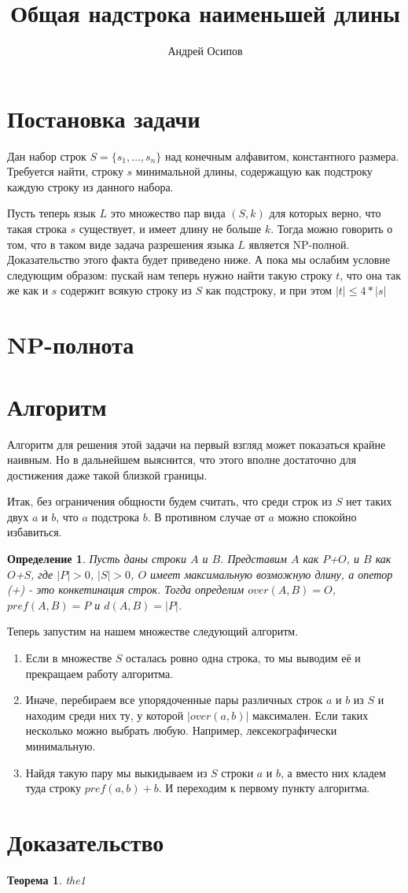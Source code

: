 \documentclass[a4paper,12pt]{article}
\title{Общая надстрока наименьшей длины}
\author{Андрей Осипов}
\newtheorem{theorem}{Теорема}
\newtheorem{definition}{Определение}
\begin{document}
\Russian
\maketitle

\section{Постановка задачи}
Дан набор строк $S = \{s_1,\dots,s_n\}$ над конечным алфавитом, константного размера. 
Требуется найти, строку $s$ минимальной длины, содержащую как подстроку каждую строку из данного набора.

Пусть теперь язык $L$ это множество пар вида $(S, k)$ для которых верно, что такая строка $s$ существует, и имеет длину не больше $k$.
Тогда можно говорить о том, что в таком виде задача разрешения языка $L$ является NP-полной.
Доказательство этого факта будет приведено ниже.
А пока мы ослабим условие следующим образом: пускай нам теперь нужно найти такую строку $t$, 
что она так же как и $s$ содержит всякую строку из $S$ как подстроку, и при этом $|t| \leq 4*|s|$

\section{NP-полнота}

\section{Алгоритм}
Алгоритм для решения этой задачи на первый взгляд может показаться крайне наивным.
Но в дальнейшем выяснится, что этого вполне достаточно для достижения даже такой близкой границы.

Итак, без ограничения общности будем считать, что среди строк из $S$ нет таких двух $a$ и $b$, что $a$ подстрока $b$.
В противном случае от $a$ можно спокойно избавиться.

\begin{definition}
Пусть даны строки $A$ и $B$.
Представим $A$ как $P$+$O$, и $B$ как $O$+$S$, где $|P|>0$, $|S|>0$, $O$ имеет максимальную возможную длину, а опетор (+) - это конкетинация строк.
Тогда определим $over(A, B) = O$, $pref(A, B) = P$ и $d(A, B) = |P|$.
\end{definition}

Теперь запустим на нашем множестве следующий алгоритм.
\begin{enumerate}
\item Если в множестве $S$ осталась ровно одна строка, то мы выводим её и прекращаем работу алгоритма.
\item Иначе, перебираем все упорядоченные пары различных строк $a$ и $b$ из $S$ и находим среди них ту, у которой $|over(a, b)|$ максимален.
Если таких несколько можно выбрать любую. Например, лексекографически минимальную.
\item Найдя такую пару мы выкидываем из $S$ строки $a$ и $b$, а вместо них кладем туда строку $pref(a, b)+b$. 
И переходим к первому пункту алгоритма.
\end{enumerate}

\section{Доказательство}

\begin{theorem}
the1
\end{theorem}
\end{document}
